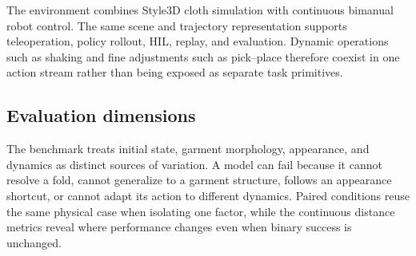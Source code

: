 The environment combines Style3D cloth simulation with continuous bimanual
robot control. The same scene and trajectory representation supports
teleoperation, policy rollout, HIL, replay, and evaluation. Dynamic operations
such as shaking and fine adjustments such as pick--place therefore coexist in
one action stream rather than being exposed as separate task primitives.

\subsection{Evaluation dimensions}

The benchmark treats initial state, garment morphology, appearance, and
dynamics as distinct sources of variation. A model can fail because it cannot
resolve a fold, cannot generalize to a garment structure, follows an appearance
shortcut, or cannot adapt its action to different dynamics. Paired conditions
reuse the same physical case when isolating one factor, while the continuous
distance metrics reveal where performance changes even when binary success is
unchanged.
